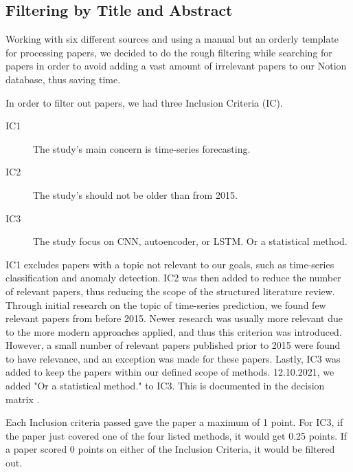 \subsection{Filtering by Title and Abstract}
Working with six different sources and using a manual but an orderly template for processing papers,
we decided to do the rough filtering while searching for papers in order to avoid adding a vast amount of irrelevant
papers to our Notion database, thus saving time.

In order to filter out papers, we had three Inclusion Criteria (IC).
\begin{description}
  \item[IC1] The study's main concern is time-series forecasting.
  \item[IC2] The study's should not be older than from 2015.
  \item[IC3] The study focus on CNN, autoencoder, or LSTM. Or a statistical method.
\end{description}
IC1 excludes papers with a topic not relevant to our goals, such as time-series classification and anomaly detection.
IC2 was then added to reduce the number of relevant papers, thus reducing the scope of the structured literature review.
Through initial research on the topic of time-series prediction, we found few relevant papers from before 2015.
Newer research was usually more relevant due to the more modern approaches applied, and thus this criterion was introduced.
However, a small number of relevant papers published prior to 2015 were found to have relevance, and an exception was made for these papers.
Lastly, IC3 was added to keep the papers within our defined scope of methods. 12.10.2021, we added "Or a statistical method."
to IC3. This is documented in the decision matrix \citep{decisionmatrix}.

Each Inclusion criteria passed gave the paper a maximum of 1 point. For IC3, if the paper just covered one of the
four listed methods, it would get 0.25 points. If a paper scored 0 points on either of the Inclusion Criteria, it would be filtered out.

